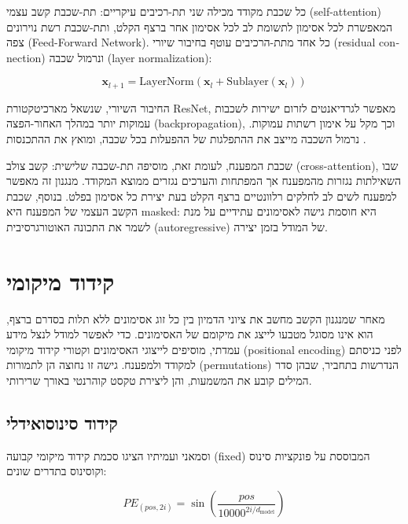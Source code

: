 כל שכבת מקודד מכילה שני תת-רכיבים עיקריים:
תת-שכבת קשב עצמי (\textenglish{self-attention}) המאפשרת
לכל אסימון לתשומת לב לכל אסימון אחר ברצף הקלט,
ותת-שכבת רשת נוירונים צפה (\textenglish{Feed-Forward Network}).
כל אחד מתת-הרכיבים עוטף בחיבור שיורי
(\textenglish{residual connection}) ונרמול שכבה
(\textenglish{layer normalization}):

\begin{equation}
  \mathbf{x}_{l+1} = \text{LayerNorm}\!\left(\mathbf{x}_l +
  \text{Sublayer}(\mathbf{x}_l)\right)
\end{equation}

החיבור השיורי, שנשאל מארכיטקטורת \textenglish{ResNet},
מאפשר לגרדיאנטים לזרום ישירות לשכבות עמוקות יותר במהלך
האחור-הפצה (\textenglish{backpropagation}), וכך מקל על
אימון רשתות עמוקות.
נרמול השכבה מייצב את ההתפלגות של ההפעלות בכל שכבה,
ומואץ את ההתכנסות \cite{vaswani2017attention}.

שכבת המפענח, לעומת זאת, מוסיפה תת-שכבה שלישית: קשב
צולב (\textenglish{cross-attention}), שבו השאילתות
נגזרות מהמפענח אך המפתחות והערכים נגזרים ממוצא המקודד.
מנגנון זה מאפשר למפענח לשים לב לחלקים רלוונטיים
ברצף הקלט בעת יצירת כל אסימון בפלט.
בנוסף, שכבת הקשב העצמי של המפענח היא \textenglish{masked}:
היא חוסמת גישה לאסימונים עתידיים על מנת לשמר את
התכונה האוטורגרסיבית (\textenglish{autoregressive}) של המודל
בזמן יצירה.


\section{קידוד מיקומי}

מאחר שמנגנון הקשב מחשב את ציוני הדמיון בין כל זוג אסימונים
ללא תלות בסדרם ברצף, הוא אינו מסוגל מטבעו לייצג את מיקומם
של האסימונים.
כדי לאפשר למודל לנצל מידע עמדתי, מוסיפים לייצוגי האסימונים
וקטורי קידוד מיקומי (\textenglish{positional encoding}) לפני
כניסתם למקודד ולמפענח.
גישה זו נחוצה הן לתמורות (permutations) הנדרשות בתחביר, שבהן
סדר המילים קובע את המשמעות, והן ליצירת טקסט קוהרנטי באורך
שרירותי.

\subsection*{קידוד סינוסואידלי}

וסמאני ועמיתיו \cite{vaswani2017attention} הציגו סכמת קידוד
מיקומי קבועה (\textenglish{fixed}) המבוססת על פונקציות
סינוס וקוסינוס בתדרים שונים:

\begin{equation}
  PE_{(pos, 2i)} = \sin\!\left(\frac{pos}{10000^{2i/d_{\text{model}}}}\right)
\end{equation}

